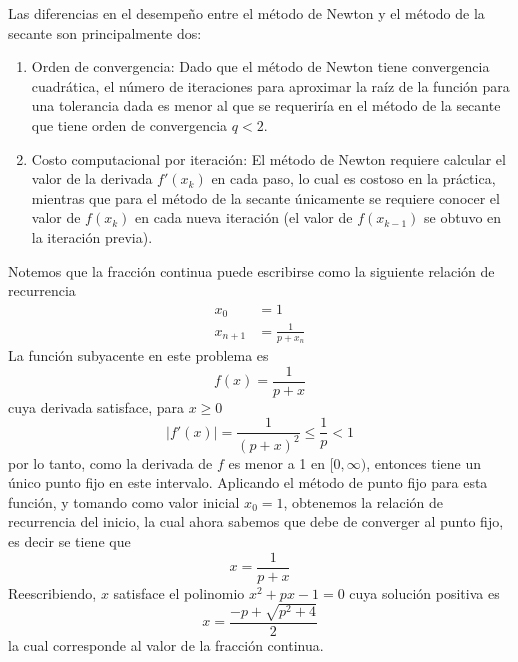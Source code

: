 \begin{problema}
\item Las diferencias en el desempeño entre el método de Newton y el método de la secante son principalmente dos:
\begin{enumerate}[label=\roman*)]
    \item Orden de convergencia: Dado que el método de Newton tiene convergencia cuadrática, el número de iteraciones para aproximar la raíz de la función para una tolerancia dada es menor al que se requeriría en el método de la secante que tiene orden de convergencia \(q<2\).
    \item Costo computacional por iteración: El método de Newton requiere calcular el valor de la derivada \(f'(x_k)\) en cada paso, lo cual es costoso en la práctica, mientras que para el método de la secante únicamente se requiere conocer el valor de \(f(x_k)\) en cada nueva iteración (el valor de \(f(x_{k-1})\) se obtuvo en la iteración previa).
\end{enumerate}
\end{problema}

\vspace{1cm}
\begin{problema}
Notemos que la fracción continua puede escribirse como la siguiente relación de recurrencia
\begin{align*}
    x_0&=1\\
    x_{n+1}&=\frac{1}{p+x_n}
\end{align*}
La función subyacente en este problema es \[f(x)=\frac{1}{p+x}\] cuya derivada satisface, para \(x\ge 0\)
\[|f'(x)|=\frac{1}{(p+x)^2}\le\frac{1}{p}<1\]
por lo tanto, como la derivada de \(f\) es menor a 1 en \([0,\infty)\), entonces tiene un único punto fijo en este intervalo. Aplicando el método de punto fijo para esta función, y tomando como valor inicial \(x_0=1\), obtenemos la relación de recurrencia del inicio, la cual ahora sabemos que debe de converger al punto fijo, es decir se tiene que 
\[x=\frac{1}{p+x}\]
Reescribiendo, \(x\) satisface el polinomio \(x^2+px-1=0\) cuya solución positiva es 
\[x=\frac{-p+\sqrt{p^2+4}}{2}\]
la cual corresponde al valor de la fracción continua.
\end{problema} 
